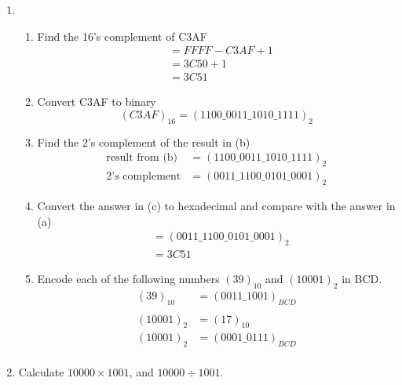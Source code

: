 \documentclass[12pt]{book}
\begin{document}
\begin{enumerate}
    \item \begin{enumerate}
        \item Find the 16's complement of C3AF
        \begin{align*}
            &= FFFF-C3AF + 1\\
            &= 3C50 + 1\\
            &= 3C51
        \end{align*}
        
        \item Convert C3AF to binary
        $$(C3AF)_{16} = (1100\_0011\_1010\_1111)_{2}$$
        
        \item Find the 2's complement of the result in (b)
        \begin{align*}
            \text{result from (b)} &= (1100\_0011\_1010\_1111)_{2}\\
            \text{2's complement} &= (0011\_1100\_0101\_0001)_{2}
        \end{align*}
        
        \item Convert the answer in (c) to hexadecimal and compare with the answer in (a)
        \begin{align*}
            &= (0011\_1100\_0101\_0001)_{2}\\
            &= 3C51
        \end{align*}
        
        \item Encode each of the following numbers $(39)_{10}$ and $(10001)_2$ in BCD.
        \begin{align*}
            (39)_{10} &= (0011\_1001)_{BCD} \\\\
            (10001)_{2} &= (17)_{10}\\
            (10001)_{2} &= (0001\_0111)_{BCD} \\
        \end{align*}
    \end{enumerate}
    
    \newpage
    
    \item Calculate $10000\times1001$, and $10000\div1001$.\\\\
    
     \\\\
    

\end{enumerate}
\end{document}
